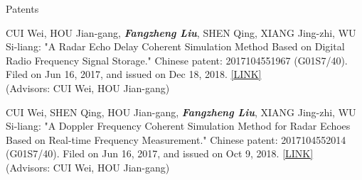\documentclass{resume} %
\begin{document}
%
\begin{rSection}{Patents}

\begin{itemlabel}
\item CUI Wei, HOU Jian-gang, \textbf{\textit{Fangzheng Liu}}, SHEN Qing, XIANG Jing-zhi, WU Si-liang: "A Radar Echo Delay Coherent Simulation Method Based on Digital Radio Frequency Signal Storage." Chinese patent: 2017104551967 (G01S7/40). Filed on Jun 16, 2017, and issued on Dec 18, 2018. \href{http://www.zlqiao.com/zlqiao/patent-f0301af6125548659bae9e05ed9543d6.html}{[LINK]}\\
(Advisors: CUI Wei, HOU Jian-gang)
\smallskip
\smallskip
\smallskip
\item CUI Wei, SHEN Qing, HOU Jian-gang, \textbf{\textit{Fangzheng Liu}}, XIANG Jing-zhi, WU Si-liang: "A Doppler Frequency Coherent Simulation Method for Radar Echoes Based on Real-time Frequency Measurement." Chinese patent: 2017104552014 (G01S7/40). Filed on Jun 16, 2017, and issued on Oct 9, 2018. \href{http://www.zlqiao.com/zlqiao/patent-4dc7dd85795d40a08320e507561834ca.html}{[LINK]}\\
(Advisors: CUI Wei, HOU Jian-gang)
\end{itemlabel}
\end{rSection}

%
\end{document}
